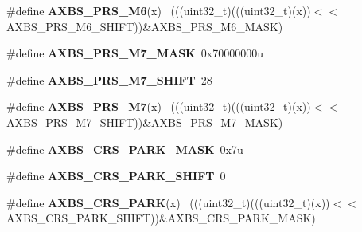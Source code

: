 \begin{DoxyCompactItemize}
\item 
\hypertarget{group___a_x_b_s___register___masks_ga6ad3c80ed78f3fe0923e206e1df2b6c2}{}\#define {\bfseries A\+X\+B\+S\+\_\+\+P\+R\+S\+\_\+\+M6}(x)                                                  ~(((uint32\+\_\+t)(((uint32\+\_\+t)(x))$<$$<$A\+X\+B\+S\+\_\+\+P\+R\+S\+\_\+\+M6\+\_\+\+S\+H\+I\+F\+T))\&A\+X\+B\+S\+\_\+\+P\+R\+S\+\_\+\+M6\+\_\+\+M\+A\+S\+K)\label{group___a_x_b_s___register___masks_ga6ad3c80ed78f3fe0923e206e1df2b6c2}

\item 
\hypertarget{group___a_x_b_s___register___masks_ga402dff54323a64f67e0f0d810e514799}{}\#define {\bfseries A\+X\+B\+S\+\_\+\+P\+R\+S\+\_\+\+M7\+\_\+\+M\+A\+S\+K}~0x70000000u\label{group___a_x_b_s___register___masks_ga402dff54323a64f67e0f0d810e514799}

\item 
\hypertarget{group___a_x_b_s___register___masks_ga0206f5f100ac67324c70f295c1f44b7c}{}\#define {\bfseries A\+X\+B\+S\+\_\+\+P\+R\+S\+\_\+\+M7\+\_\+\+S\+H\+I\+F\+T}~28\label{group___a_x_b_s___register___masks_ga0206f5f100ac67324c70f295c1f44b7c}

\item 
\hypertarget{group___a_x_b_s___register___masks_gabeb2208c9d47afd499b44047ce71dedd}{}\#define {\bfseries A\+X\+B\+S\+\_\+\+P\+R\+S\+\_\+\+M7}(x)                                                  ~(((uint32\+\_\+t)(((uint32\+\_\+t)(x))$<$$<$A\+X\+B\+S\+\_\+\+P\+R\+S\+\_\+\+M7\+\_\+\+S\+H\+I\+F\+T))\&A\+X\+B\+S\+\_\+\+P\+R\+S\+\_\+\+M7\+\_\+\+M\+A\+S\+K)\label{group___a_x_b_s___register___masks_gabeb2208c9d47afd499b44047ce71dedd}

\item 
\hypertarget{group___a_x_b_s___register___masks_gadfcbad36cb3a462a0ddbb4fd7ec4dc6d}{}\#define {\bfseries A\+X\+B\+S\+\_\+\+C\+R\+S\+\_\+\+P\+A\+R\+K\+\_\+\+M\+A\+S\+K}~0x7u\label{group___a_x_b_s___register___masks_gadfcbad36cb3a462a0ddbb4fd7ec4dc6d}

\item 
\hypertarget{group___a_x_b_s___register___masks_ga3beb82412a3e9fbd7712210fcb073d73}{}\#define {\bfseries A\+X\+B\+S\+\_\+\+C\+R\+S\+\_\+\+P\+A\+R\+K\+\_\+\+S\+H\+I\+F\+T}~0\label{group___a_x_b_s___register___masks_ga3beb82412a3e9fbd7712210fcb073d73}

\item 
\hypertarget{group___a_x_b_s___register___masks_ga302f38bdb85280705d4d28c1d57467a2}{}\#define {\bfseries A\+X\+B\+S\+\_\+\+C\+R\+S\+\_\+\+P\+A\+R\+K}(x)                                              ~(((uint32\+\_\+t)(((uint32\+\_\+t)(x))$<$$<$A\+X\+B\+S\+\_\+\+C\+R\+S\+\_\+\+P\+A\+R\+K\+\_\+\+S\+H\+I\+F\+T))\&A\+X\+B\+S\+\_\+\+C\+R\+S\+\_\+\+P\+A\+R\+K\+\_\+\+M\+A\+S\+K)\label{group___a_x_b_s___register___masks_ga302f38bdb85280705d4d28c1d57467a2}


\end{DoxyCompactItemize}
